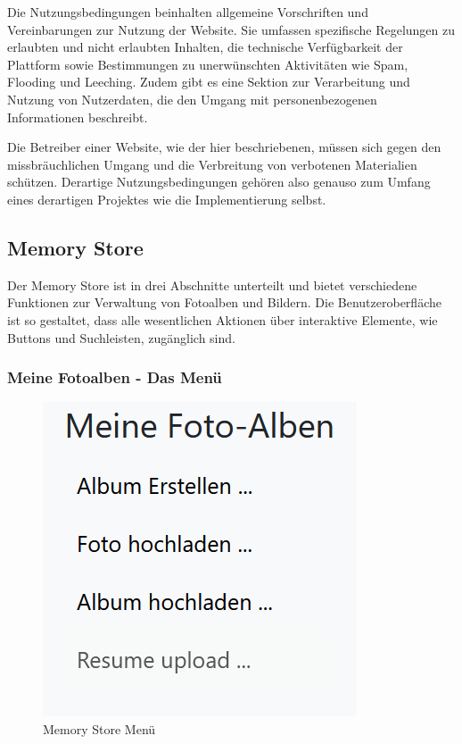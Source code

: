 Die Nutzungsbedingungen beinhalten allgemeine Vorschriften und Vereinbarungen zur Nutzung der Website. Sie umfassen spezifische Regelungen zu erlaubten und nicht erlaubten Inhalten, die technische Verfügbarkeit der Plattform sowie Bestimmungen zu unerwünschten Aktivitäten wie Spam, Flooding und Leeching. Zudem gibt es eine Sektion zur Verarbeitung und Nutzung von Nutzerdaten, die den Umgang mit personenbezogenen Informationen beschreibt.

Die Betreiber einer Website, wie der hier beschriebenen, müssen sich gegen den missbräuchlichen Umgang und die Verbreitung von verbotenen Materialien schützen. Derartige Nutzungsbedingungen gehören also genauso zum Umfang eines derartigen Projektes wie die Implementierung selbst.






\subsection{Memory Store}

Der Memory Store ist in drei Abschnitte unterteilt und bietet verschiedene Funktionen zur Verwaltung von Fotoalben und Bildern. Die Benutzeroberfläche ist so gestaltet, dass alle wesentlichen Aktionen über interaktive Elemente, wie Buttons und Suchleisten, zugänglich sind.

\subsubsection{Meine Fotoalben - Das Menü}

\begin{figure}
    \centering
    \includegraphics[scale=0.8]{pics/memory_store_menu.PNG}
    \caption{Memory Store Menü}
    \label{fig:memory-store-menu}
\end{figure}


